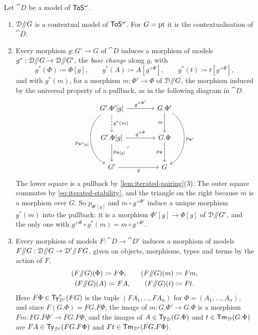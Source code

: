 \begin{lemma}\label{lem:contextual-slice}
    Let $\cat{D}$ be a model of $\mathsf{ToS}^\omega$.
    \begin{enumerate}
        \item $\mathcal{D}\mathord{/\mkern-5mu/} G$ is a contextual model of $\mathsf{ToS}^\omega$. For $G = \mathrm{pt}$ it is the contextualisation of $\cat{D}$.
        \item Every morphism $g : G' \to G$ of $\cat{D}$ induces a morphism of models $g^* : \mathcal{D}\mathord{/\mkern-5mu/} G \to \mathcal{D}\mathord{/\mkern-5mu/} G'$, the \emph{base change} along $g$, with
        \[
            g^*(\Phi) \coloneqq \Phi[g], \qquad g^*(A) \coloneqq A[g^{+\Phi}], \qquad g^*(t) \coloneqq t[g^{+\Phi}],
        \]
        and with $g^*(m)$, for a morphism $m : \Phi' \to \Phi$ of $\mathcal{D}\mathord{/\mkern-5mu/} G$, the morphism induced by the universal property of a pullback, as in the following diagram in $\cat{D}$.
        \[\begin{tikzcd}[column sep=4em, row sep=2.5em]
            {G'.\Phi'[g]} & {G.\Phi'} \\
            {G'.\Phi[g]} & {G.\Phi} \\
            {G'} & G
            \arrow["{g^{+\Phi'}}", from=1-1, to=1-2]
            \arrow["{g^*(m)}", dashed, from=1-1, to=2-1]
            \arrow["{p_{\Phi'[g]}}"', bend right=60, from=1-1, to=3-1]
            \arrow["m"', from=1-2, to=2-2]
            \arrow["{p_{\Phi'}}", bend left=60, from=1-2, to=3-2]
            \arrow["{g^{+\Phi}}", from=2-1, to=2-2]
            \arrow["{p_{\Phi[g]}}", from=2-1, to=3-1]
            \arrow["\lrcorner"{anchor=center, pos=0.125}, draw=none, from=2-1, to=3-2]
            \arrow["{p_\Phi}"', from=2-2, to=3-2]
            \arrow["g"', from=3-1, to=3-2]
        \end{tikzcd}\]
        The lower square is a pullback by \cref{lem:iterated-pairing}(3). The outer square commutes by \eqref{eq:iterated-stability}, and the triangle on the right because $m$ is a morphism over $G$. So $p_{\Phi'[g]}$ and $m \circ g^{+\Phi'}$ induce a unique morphism $g^*(m)$ into the pullback: it is a morphism $\Phi'[g] \to \Phi[g]$ of $\mathcal{D}\mathord{/\mkern-5mu/} G'$, and the only one with $g^{+\Phi} \circ g^*(m) = m \circ g^{+\Phi'}$.
        \item Every morphism of models $F : \cat{D} \to \cat{D}'$ induces a morphism of models $F\mathord{/\mkern-5mu/} G : \mathcal{D}\mathord{/\mkern-5mu/} G \to \mathcal{D}'\mathord{/\mkern-5mu/} FG$, given on objects, morphisms, types and terms by the action of $F$,
        \begin{gather*}
            (F\mathord{/\mkern-5mu/} G)(\Phi) \coloneqq F\Phi, \qquad (F\mathord{/\mkern-5mu/} G)(m) \coloneqq Fm,\\
            (F\mathord{/\mkern-5mu/} G)(A) \coloneqq FA, \qquad (F\mathord{/\mkern-5mu/} G)(t) \coloneqq Ft.
        \end{gather*}
        Here $F\Phi \in \mathsf{Ty}^*_{\mathcal{D}'}(FG)$ is the tuple $(FA_1, \ldots, FA_n)$ for $\Phi = (A_1, \ldots, A_n)$, and since $F(G.\Phi) = FG.F\Phi$, the image of $m : G.\Phi' \to G.\Phi$ is a morphism $Fm : FG.F\Phi' \to FG.F\Phi$, and the images of $A \in \mathsf{Ty}_{\mathcal{D}}(G.\Phi)$ and $t \in \mathsf{Tm}_{\mathcal{D}}(G.\Phi)$ are $FA \in \mathsf{Ty}_{\mathcal{D}'}(FG.F\Phi)$ and $Ft \in \mathsf{Tm}_{\mathcal{D}'}(FG.F\Phi)$.
    \end{enumerate}
\end{lemma}

